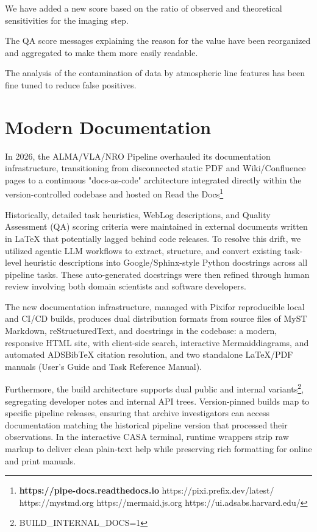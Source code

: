 \documentclass[11pt,twoside]{article}
\begin{document}
We have added a new score based on the ratio of observed and theoretical
sensitivities for the imaging step.

The QA score messages explaining the reason for the value have been
reorganized and aggregated to make them more easily readable.

The analysis of the contamination of data by atmospheric line features
has been fine tuned to reduce false positives.

\section{Modern Documentation}
In 2026, the ALMA/VLA/NRO Pipeline overhauled its documentation
infrastructure, transitioning from disconnected static PDF and
Wiki/Confluence pages to a continuous "docs-as-code" architecture
integrated directly within the version-controlled codebase and hosted
on Read the Docs\footnote[1]{{\bf https://pipe-docs.readthedocs.io}
https://pixi.prefix.dev/latest/
https://mystmd.org
https://mermaid.js.org
https://ui.adsabs.harvard.edu/}

Historically, detailed task heuristics, WebLog descriptions, and
Quality Assessment (QA) scoring criteria were maintained in external
documents written in LaTeX that potentially lagged behind code
releases. To resolve this drift, we utilized agentic LLM workflows to
extract, structure, and convert existing task-level heuristic
descriptions into Google/Sphinx-style Python docstrings across all
pipeline tasks. These auto-generated docstrings were then refined
through human review involving both domain scientists and software
developers.

The new documentation infrastructure, managed with
Pixi\footnotemark[1] for reproducible local and
CI/CD builds, produces dual distribution formats from source files of
MyST Markdown\footnotemark[1], reStructuredText, and docstrings
in the codebase: a modern, responsive HTML site, with client-side
search, interactive Mermaid\footnotemark[1] diagrams, and
automated ADS\footnotemark[1] BibTeX citation
resolution, and two standalone LaTeX/PDF manuals (User's Guide and Task
Reference Manual).

Furthermore, the build architecture supports dual public and internal
variants\footnote[2]{BUILD\_INTERNAL\_DOCS=1}, segregating developer notes and
internal API trees. Version-pinned builds map to specific pipeline
releases, ensuring that archive investigators can access documentation
matching the historical pipeline version that processed their
observations. In the interactive CASA terminal, runtime wrappers
strip raw markup to deliver clean plain-text help while preserving rich
formatting for online and print manuals.


\end{document}
